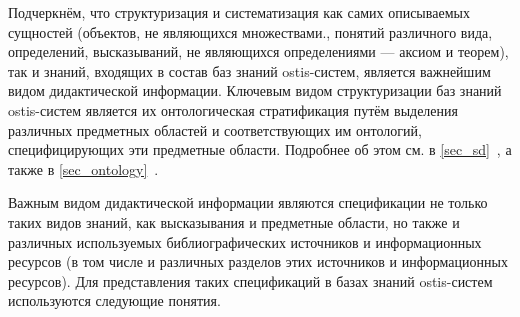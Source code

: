 \begin{SCn}
\begin{SCn}
\end{SCn}

\begin{SCn}
\end{SCn}

\begin{SCn}
\end{SCn}

\begin{SCn}
\end{SCn}

Подчеркнём, что структуризация и систематизация как самих описываемых сущностей (объектов, не являющихся множествами., понятий различного вида, определений, высказываний, не являющихся определениями --- аксиом и теорем), так и знаний, входящих в состав баз знаний ostis-систем, является важнейшим видом дидактической информации. Ключевым видом структуризации баз знаний ostis-систем является их онтологическая стратификация путём выделения различных предметных областей и соответствующих им онтологий, специфицирующих эти предметные области. Подробнее об этом см. в \ref{sec_sd}~, а также в \ref{sec_ontology}~.

Важным видом дидактической информации являются спецификации не только таких видов знаний, как высказывания и предметные области, но также и различных используемых библиографических источников и информационных ресурсов (в том числе и различных разделов этих источников и информационных ресурсов). Для представления таких спецификаций в базах знаний ostis-систем используются следующие понятия.

\begin{SCn}
\end{SCn}


\end{SCn}
